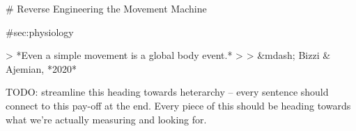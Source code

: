 \documentclass[../main.tex]{subfiles}
\begin{document}











# Reverse Engineering the Movement Machine

{#sec:physiology}

> *Even a simple movement is a global body event.*
>
> &mdash; Bizzi & Ajemian, *2020*

 TODO: streamline this heading towards heterarchy -- every sentence should connect to this pay-off at the end. 
 Every piece of this should be heading towards what we're actually measuring and looking for. 
\end{document}
